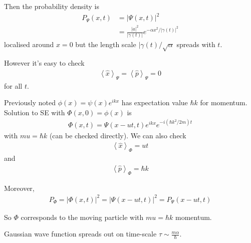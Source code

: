 \documentclass[a4paper]{article}
\begin{document}
Then the probability density is
\begin{equation*}
\begin{aligned}
P_\Psi\left(x,t\right) &= \left|\Psi\left(x,t\right)\right|^2 \\
&= \frac{|a|^2}{|\gamma\left(t\right)|} e^{-\alpha x^2/|\gamma\left(t\right)|^2}
\end{aligned}
\end{equation*}
localised around $x=0$ but the length scale $|\gamma\left(t\right)/\sqrt{\alpha}$ spreads with $t$.

However it's easy to check
\begin{equation*}
\begin{aligned}
\left<\hat{x}\right>_\Psi = \left<\hat{p}\right>_\Psi = 0
\end{aligned}
\end{equation*}
for all $t$.

Previously noted $\phi\left(x\right) = \psi\left(x\right) e^{ikx}$ has expectation value $\hbar k$ for momentum. Solution to SE with $\Phi\left(x,0\right) = \phi \left(x\right)$ is
\begin{equation*}
\begin{aligned}
\Phi\left(x,t\right) = \Psi\left(x-ut,t\right)e^{ikx}e^{-i\left(\hbar k^2/2m\right)t}
\end{aligned}
\end{equation*}
with $mu = \hbar k$ (can be checked directly). We can also check
\begin{equation*}
\begin{aligned}
\left<\hat{x}\right>_\Phi = ut
\end{aligned}
\end{equation*}
and
\begin{equation*}
\begin{aligned}
\left<\hat{p}\right>_\Phi = \hbar k
\end{aligned}
\end{equation*}

Moreover,
\begin{equation*}
\begin{aligned}
P_\Phi = \left|\Phi\left(x,t\right)\right|^2  = \left|\Psi\left(x-ut,t\right)\right|^2 = P_\Psi\left(x-ut,t\right)
\end{aligned}
\end{equation*}

So $\Phi$ corresponds to the moving particle with $mu = \hbar k$ momentum.

Gaussian wave function spreads out on time-scale $\tau \sim \frac{m\alpha}{\hbar}$.
\end{document}
